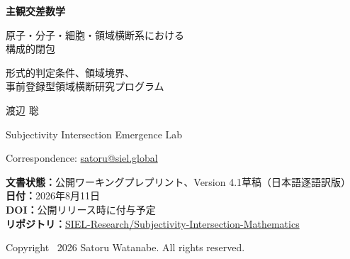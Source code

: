 \documentclass[11pt,a4paper]{article}
\begin{document}
\begin{titlepage}
\thispagestyle{empty}
\vspace*{18mm}
{\sffamily\bfseries\color{SIELblue}\fontsize{24}{29}\selectfont
主観交差数学\par}
\vspace{6mm}
{\sffamily\fontsize{18}{23}\selectfont
原子・分子・細胞・領域横断系における\\構成的閉包\par}
\vspace{7mm}
{\sffamily\fontsize{15}{19}\selectfont
形式的判定条件、領域境界、\\事前登録型領域横断研究プログラム\par}

\vspace{18mm}
{\large 渡辺 聡\par}
\vspace{2mm}
{\normalsize Subjectivity Intersection Emergence Lab\par}
{\normalsize Correspondence: \href{mailto:satoru@siel.global}{satoru@siel.global}\par}

\vfill
\noindent\colorbox{SIELlight}{%
  \parbox{0.93\textwidth}{%
  \vspace{2mm}
  \textbf{文書状態：}公開ワーキングプレプリント、Version 4.1草稿（日本語逐語訳版）\\
  \textbf{日付：}2026年8月11日\\
  \textbf{DOI：}公開リリース時に付与予定\\
  \textbf{リポジトリ：}\href{https://github.com/SIEL-Research/Subjectivity-Intersection-Mathematics}{SIEL-Research/Subjectivity-Intersection-Mathematics}\\
  \vspace{2mm}
  }}

\vspace{10mm}
{\small Copyright \textcopyright\ 2026 Satoru Watanabe. All rights reserved.\par}
\end{titlepage}
\end{document}
